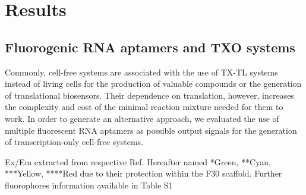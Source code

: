 \section*{Results}
\subsection*{Fluorogenic RNA aptamers and TXO systems}

Commonly, cell-free systems are associated with the use of TX-TL systems instead of living cells for the production of valuable compounds or the generation of translational biosensors. Their dependence on translation, however, increases the complexity and cost of the minimal reaction mixture needed for them to work. In order to generate an alternative approach, we evaluated the use of multiple fluorescent RNA aptamers as possible output signals for the generation of transcription-only cell-free systems.

\begin{table}[h]
{Ex/Em extracted from respective Ref. 
Hereafter named *Green, **Cyan, ***Yellow, ****Red due to their protection within the F30 scaffold. Further  fluorophores information   available in Table S1}
\end{table}


